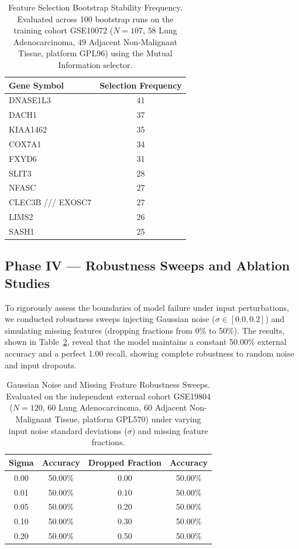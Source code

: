 \documentclass[journal,10pt]{IEEEtran}
\begin{document}
\begin{table}[htbp]
\centering
\caption{Feature Selection Bootstrap Stability Frequency. Evaluated across 100 bootstrap runs on the training cohort GSE10072 ($N=107$, $58$ Lung Adenocarcinoma, $49$ Adjacent Non-Malignant Tissue, platform GPL96) using the Mutual Information selector.}
\label{tab:bootstrap_stability}
\begin{tabular}{lc}
\toprule
\textbf{Gene Symbol} & \textbf{Selection Frequency} \\
\midrule
DNASE1L3 & 41 \\
DACH1 & 37 \\
KIAA1462 & 35 \\
COX7A1 & 34 \\
FXYD6 & 31 \\
SLIT3 & 28 \\
NFASC & 27 \\
CLEC3B /// EXOSC7 & 27 \\
LIMS2 & 26 \\
SASH1 & 25 \\
\bottomrule
\end{tabular}
\end{table}

\subsection{Phase IV --- Robustness Sweeps and Ablation Studies}
To rigorously assess the boundaries of model failure under input perturbations, we conducted robustness sweeps injecting Gaussian noise ($\sigma \in [0.0, 0.2]$) and simulating missing features (dropping fractions from 0\% to 50\%). The results, shown in Table~\ref{tab:robustness_sweeps}, reveal that the model maintains a constant 50.00\% external accuracy and a perfect 1.00 recall, showing complete robustness to random noise and input dropouts.

\begin{table}[htbp]
\centering
\caption{Gaussian Noise and Missing Feature Robustness Sweeps. Evaluated on the independent external cohort GSE19804 ($N=120$, $60$ Lung Adenocarcinoma, $60$ Adjacent Non-Malignant Tissue, platform GPL570) under varying input noise standard deviations ($\sigma$) and missing feature fractions.}
\label{tab:robustness_sweeps}
\begin{tabular}{cc|cc}
\toprule
\textbf{Sigma} & \textbf{Accuracy} & \textbf{Dropped Fraction} & \textbf{Accuracy} \\
\midrule
0.00 & 50.00\% & 0.00 & 50.00\% \\
0.01 & 50.00\% & 0.10 & 50.00\% \\
0.05 & 50.00\% & 0.20 & 50.00\% \\
0.10 & 50.00\% & 0.30 & 50.00\% \\
0.20 & 50.00\% & 0.50 & 50.00\% \\
\bottomrule
\end{tabular}
\end{table}
\end{document}
